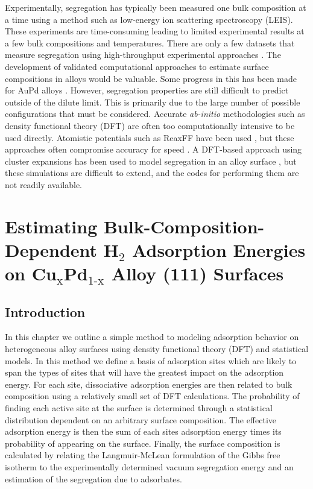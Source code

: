 \documentclass[12pt]{cmuthesis}
\begin{document}
Experimentally, segregation has typically been measured one bulk composition at a time \cite{chen-2006-natur-activ,bocarme-2009-surfac-segreg,haire-2011-influen-prepar} using a method such as low-energy ion scattering spectroscopy (LEIS). These experiments are time-consuming leading to limited experimental results at a few bulk compositions and temperatures. There are only a few datasets that measure segregation using high-throughput experimental approaches \cite{priyadarshini-2011-high-throug}. The development of validated computational approaches to estimate surface compositions in alloys would be valuable. Some progress in this has been made for AuPd alloys \cite{soto-verdugo-2007-segreg-at,atanasov-2009-equil-order,creuze-2015-surfac-segreg}. However, segregation properties are still difficult to predict outside of the dilute limit. This is primarily due to the large number of possible configurations that must be considered. Accurate \emph{ab-initio} methodologies such as density functional theory (DFT) are often too computationally intensive to be used directly. Atomistic potentials such as ReaxFF have been used \cite{kwak-2012-ab-initio}, but these approaches often compromise accuracy for speed \cite{boes-2016-neural-networ}. A DFT-based approach using cluster expansions has been used to model segregation in an alloy surface \cite{han-2005-surfac-segreg,welker-2010-predic-segreg}, but these simulations are difficult to extend, and the codes for performing them are not readily available.

\chapter{Estimating Bulk-Composition-Dependent H\(_{\text{2}}\) Adsorption Energies on Cu\(_{\text{x}}\)Pd\(_{\text{1-x}}\) Alloy (111) Surfaces}
\label{sec:ch2}
\section{Introduction}
\label{sec:org8a5ed08}
In this chapter we outline a simple method to modeling adsorption behavior on heterogeneous alloy surfaces using density functional theory (DFT) and statistical models. In this method we define a basis of adsorption sites which are likely to span the types of sites that will have the greatest impact on the adsorption energy. For each site, dissociative adsorption energies are then related to bulk composition using a relatively small set of DFT calculations. The probability of finding each active site at the surface is determined through a statistical distribution dependent on an arbitrary surface composition. The effective adsorption energy is then the sum of each sites adsorption energy times its probability of appearing on the surface. Finally, the surface composition is calculated by relating the Langmuir-McLean formulation of the Gibbs free isotherm to the experimentally determined vacuum segregation energy and an estimation of the segregation due to adsorbates.
\end{document}
